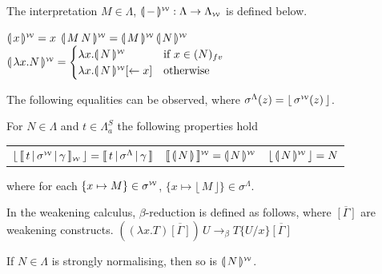 \documentclass[runningheads]{llncs}
\newcommand{\FALC}{\Lambda^{S}_{a}}
\newcommand{\WEAK}{\Lambda_{\weaksymbol}}
\newcommand{\fv}[1]{(#1)_{fv}}
\newcommand{\set}[1]{ \{ #1 \} }
\newcommand{\abs}[2]{\lambda #1 . #2}
\newcommand{\app}[2]{#1 \, #2}
\newcommand{\share}[3]{#1 [#2 \leftarrow #3]}
\newcommand{\sub}[3]{#1 \{ #2 / #3 \}}
\newcommand{\compile}[1]{\llparenthesis \, #1 \, \rrparenthesis}
\newcommand{\weaksymbol}{\mbox{\tiny $\mathcal{W}$}}
\newcommand{\readbackwmap}[3]{\llbracket \, #1 \, \vert \, #2 \, \vert \, #3  \, \rrbracket }
\newcommand{\readweakwmap}[3]{\llbracket \, #1 \, \vert \, #2 \, \vert \, #3  \, \rrbracket_{\weaksymbol} }
\newcommand{\compweak}[1]{\llparenthesis \, #1 \, \rrparenthesis^{\weaksymbol}}
\newcommand{\readbackweak}[1]{\lfloor \, #1 \, \rfloor}
\newcommand{\composeweak}[1]{\llbracket \, #1 \, \rrbracket^{\weaksymbol}}
\begin{document}
\begin{definition}
\label{def:transweak}
The interpretation $M \in \Lambda$, $\compweak{-} : \Lambda \rightarrow \WEAK$ is defined below.

\noindent
	$\compweak{x} = x$ \hspace{0.2cm}
	$\compweak{\app{M}{N}} = \app{\compweak{M}}{\compweak{N}}$ 
	\hspace{0.2cm}
	$\compweak{\abs{x}{N}} =
	\begin{cases}
		\abs{x}{\compweak{N}} & \text{if } x \in \fv{N} \\
		\abs{x}{\compweak{N} \share{}{}{x}} & \text{otherwise}
	\end{cases}$

\end{definition}
\noindent The following equalities can be observed, where $\sigma^{\Lambda}(z) = \readbackweak{\sigma^{\weaksymbol}(z)} $.
\begin{proposition}
\label{prop:equalterms}
For $N \in \Lambda$ and $t \in \FALC$ the following properties hold
\begin{center}
\begin{tabular}{c@{\hskip 0.5in} c@{\hskip 0.5in} c}
	$\readbackweak{\readweakwmap{t}{\sigma^{\weaksymbol}}{\gamma}} = \readbackwmap{t}{\sigma^{\Lambda}}{\gamma}$
	&
	$\composeweak{\compile{N}} = \compweak{N}$
	&
	$\readbackweak{\compweak{N}} = N$
\end{tabular}
\end{center}
 \noindent where for each $\set{x \mapsto M} \in \sigma^{\weaksymbol}$, $\set{x \mapsto \readbackweak{M}} \in \sigma^{\Lambda}$.
\end{proposition}

\begin{definition}
In the weakening calculus, $\beta$-reduction is defined as follows, where $\overline{[\Gamma]}$ are weakening constructs.
	$ \app{((\abs{x}{T}) \overline{[\Gamma]})}{U} \rightarrow_{\beta} \sub{T}{U}{x} \overline{[\Gamma]} $
\end{definition}

\begin{proposition}
\label{prop:willemresult}
 If $N \in \Lambda$ is strongly normalising, then so is $\compweak{N}$.
\end{proposition}

\end{document}
